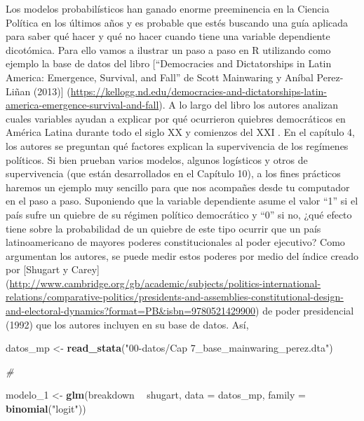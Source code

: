 \documentclass[]{book}
\newenvironment{Shaded}{\begin{snugshade}}{\end{snugshade}}
\newcommand{\KeywordTok}[1]{\textcolor[rgb]{0.13,0.29,0.53}{\textbf{#1}}}
\newcommand{\DataTypeTok}[1]{\textcolor[rgb]{0.13,0.29,0.53}{#1}}
\newcommand{\DecValTok}[1]{\textcolor[rgb]{0.00,0.00,0.81}{#1}}
\newcommand{\StringTok}[1]{\textcolor[rgb]{0.31,0.60,0.02}{#1}}
\newcommand{\CommentTok}[1]{\textcolor[rgb]{0.56,0.35,0.01}{\textit{#1}}}
\newcommand{\OperatorTok}[1]{\textcolor[rgb]{0.81,0.36,0.00}{\textbf{#1}}}
\newcommand{\NormalTok}[1]{#1}
\begin{document}
Los modelos probabilísticos han ganado enorme preeminencia en la Ciencia
Política en los últimos años y es probable que estés buscando una guía
aplicada para saber qué hacer y qué no hacer cuando tiene una variable
dependiente dicotómica. Para ello vamos a ilustrar un paso a paso en R
utilizando como ejemplo la base de datos del libro {[}``Democracies and
Dictatorships in Latin America: Emergence, Survival, and Fall'' de Scott
Mainwaring y Aníbal Perez-Liñan (2013){]}
(\url{https://kellogg.nd.edu/democracies-and-dictatorships-latin-america-emergence-survival-and-fall}).
A lo largo del libro los autores analizan cuales variables ayudan a
explicar por qué ocurrieron quiebres democráticos en América Latina
durante todo el siglo XX y comienzos del XXI . En el capítulo 4, los
autores se preguntan qué factores explican la supervivencia de los
regímenes políticos. Si bien prueban varios modelos, algunos logísticos
y otros de supervivencia (que están desarrollados en el Capítulo 10), a
los fines prácticos haremos un ejemplo muy sencillo para que nos
acompañes desde tu computador en el paso a paso. Suponiendo que la
variable dependiente asume el valor ``1'' si el país sufre un quiebre de
su régimen político democrático y ``0'' si no, ¿qué efecto tiene sobre
la probabilidad de un quiebre de este tipo ocurrir que un país
latinoamericano de mayores poderes constitucionales al poder ejecutivo?
Como argumentan los autores, se puede medir estos poderes por medio del
índice creado por {[}Shugart y Carey{]}
(\url{http://www.cambridge.org/gb/academic/subjects/politics-international-relations/comparative-politics/presidents-and-assemblies-constitutional-design-and-electoral-dynamics?format=PB\&isbn=9780521429900})
de poder presidencial (1992) que los autores incluyen en su base de
datos. Así,

\begin{Shaded}
\begin{Highlighting}[]
\NormalTok{datos_mp <-}\StringTok{ }\KeywordTok{read_stata}\NormalTok{(}\StringTok{"00-datos/Cap 7_base_mainwaring_perez.dta"}\NormalTok{)}
\end{Highlighting}
\end{Shaded}

\begin{Shaded}
\begin{Highlighting}[]
\CommentTok{#}
\end{Highlighting}
\end{Shaded}

\begin{Shaded}
\begin{Highlighting}[]
\NormalTok{modelo_}\DecValTok{1}\NormalTok{ <-}\StringTok{ }\KeywordTok{glm}\NormalTok{(breakdown }\OperatorTok{~}\StringTok{ }\NormalTok{shugart, }
                \DataTypeTok{data   =}\NormalTok{ datos_mp,}
                \DataTypeTok{family =} \KeywordTok{binomial}\NormalTok{(}\StringTok{"logit"}\NormalTok{))}
\end{Highlighting}
\end{Shaded}
\end{document}
